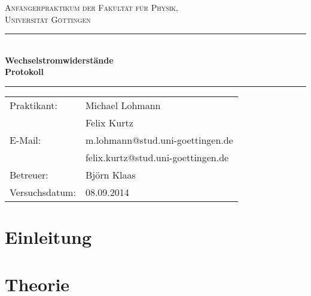 \documentclass[12pt,a4paper,titlepage,headinclude,bibtotoc]{scrartcl}
\begin{document}
\begin{titlepage}
\centering
\textsc{\Large Anfängerpraktikum der Fakultät für
  Physik,\\[1.5ex] Universität Göttingen}

\vspace*{4.2cm}

\rule{\textwidth}{1pt}\\[0.5cm]
{\huge \bfseries
  Wechselstromwiderstände\\[1.5ex]
  Protokoll}\\[0.5cm]
\rule{\textwidth}{1pt}

\vspace*{2.5cm}

\begin{Large}
\begin{tabular}{ll}
Praktikant: &  Michael Lohmann\\
 &  Felix Kurtz\\
 E-Mail: & m.lohmann@stud.uni-goettingen.de\\
 &  felix.kurtz@stud.uni-goettingen.de\\
 Betreuer: & Björn Klaas\\
 Versuchsdatum: & 08.09.2014\\
\end{tabular}
\end{Large}

\vspace*{0.8cm}

\begin{Large}
\end{Large}

\end{titlepage}

\tableofcontents

\newpage

\section{Einleitung}
\label{sec:einleitung}
\cite{LP}
\section{Theorie}
\label{sec:theorie}
                                                                                                                                                                      
\end{document}
